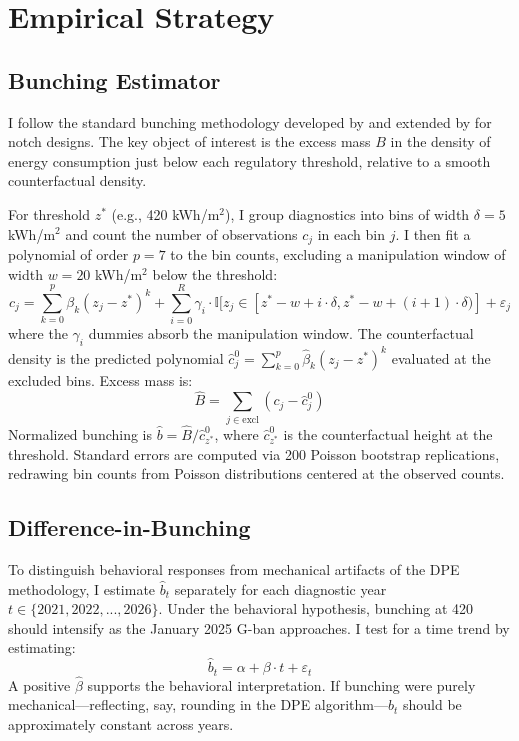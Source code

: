 \documentclass[12pt]{article}
\newcommand{\ind}{\mathbb{I}}
\begin{document}



\section{Empirical Strategy}

\subsection{Bunching Estimator}

I follow the standard bunching methodology developed by \citet{saez2010} and extended by \citet{kleven2013} for notch designs. The key object of interest is the excess mass $B$ in the density of energy consumption just below each regulatory threshold, relative to a smooth counterfactual density.

For threshold $z^*$ (e.g., 420 kWh/m$^2$), I group diagnostics into bins of width $\delta = 5$ kWh/m$^2$ and count the number of observations $c_j$ in each bin $j$. I then fit a polynomial of order $p = 7$ to the bin counts, excluding a manipulation window of width $w = 20$ kWh/m$^2$ below the threshold:
\begin{equation}
c_j = \sum_{k=0}^{p} \beta_k (z_j - z^*)^k + \sum_{i=0}^{R} \gamma_i \cdot \ind[z_j \in [z^* - w + i \cdot \delta, z^* - w + (i+1) \cdot \delta)] + \varepsilon_j
\end{equation}
where the $\gamma_i$ dummies absorb the manipulation window. The counterfactual density is the predicted polynomial $\hat{c}_j^0 = \sum_{k=0}^{p} \hat{\beta}_k (z_j - z^*)^k$ evaluated at the excluded bins. Excess mass is:
\begin{equation}
\hat{B} = \sum_{j \in \text{excl}} (c_j - \hat{c}_j^0)
\end{equation}
Normalized bunching is $\hat{b} = \hat{B} / \hat{c}_{z^*}^0$, where $\hat{c}_{z^*}^0$ is the counterfactual height at the threshold. Standard errors are computed via 200 Poisson bootstrap replications, redrawing bin counts from Poisson distributions centered at the observed counts.

\subsection{Difference-in-Bunching}

To distinguish behavioral responses from mechanical artifacts of the DPE methodology, I estimate $\hat{b}_t$ separately for each diagnostic year $t \in \{2021, 2022, ..., 2026\}$. Under the behavioral hypothesis, bunching at 420 should intensify as the January 2025 G-ban approaches. I test for a time trend by estimating:
\begin{equation}
\hat{b}_t = \alpha + \beta \cdot t + \varepsilon_t
\end{equation}
A positive $\hat{\beta}$ supports the behavioral interpretation. If bunching were purely mechanical---reflecting, say, rounding in the DPE algorithm---$\hat{b}_t$ should be approximately constant across years.
\end{document}
